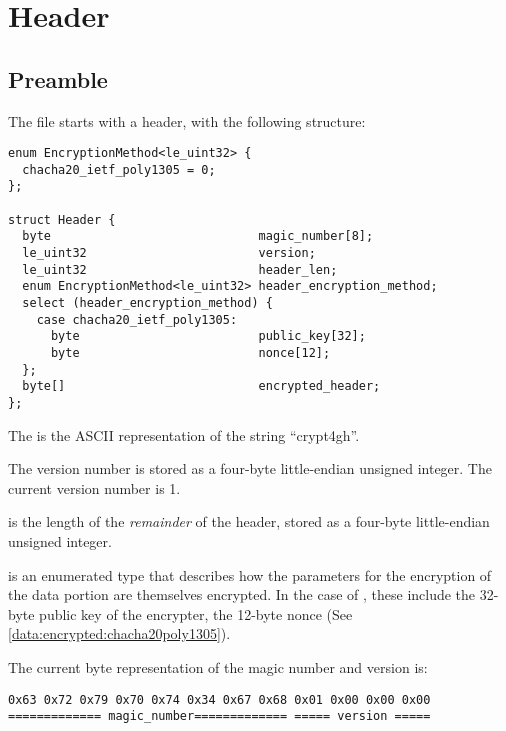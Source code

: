 \section{Header}\label{header}

\subsection{Preamble}\label{header:preamble}

The file starts with a header, with the following structure:

\begin{verbatim}
enum EncryptionMethod<le_uint32> {
  chacha20_ietf_poly1305 = 0;
};

struct Header {
  byte                             magic_number[8];
  le_uint32                        version;
  le_uint32                        header_len;
  enum EncryptionMethod<le_uint32> header_encryption_method;
  select (header_encryption_method) {
    case chacha20_ietf_poly1305:
      byte                         public_key[32];
      byte                         nonce[12];
  };
  byte[]                           encrypted_header;
};
\end{verbatim}

The  is the ASCII representation of the string ``crypt4gh''.

The version number is stored as a four-byte little-endian unsigned integer.
%
The current version number is 1.

 is the length of the \emph{remainder} of the header, stored as a four-byte little-endian unsigned integer.
%

 is an enumerated type that describes how the parameters for the encryption of the data portion are themselves encrypted.
%
In the case of , these include the 32-byte public key of the encrypter, the 12-byte nonce (See \ref{data:encrypted:chacha20poly1305}).

The current byte representation of the magic number and version is:
\begin{verbatim}
0x63 0x72 0x79 0x70 0x74 0x34 0x67 0x68 0x01 0x00 0x00 0x00
============= magic_number============= ===== version =====
\end{verbatim}



